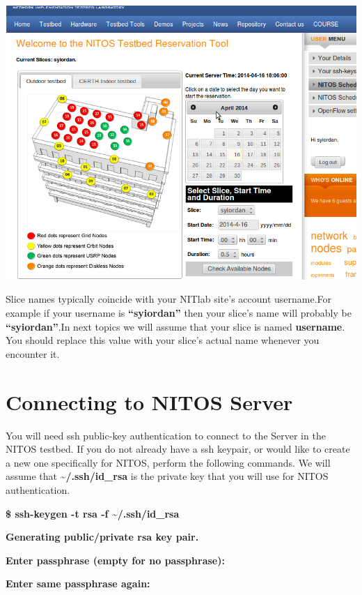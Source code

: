 \documentclass[letterpaper,10pt,english]{sphinxmanual}
\begin{document}
\includegraphics{ReservationPage.png}

Slice names typically coincide with your NITlab site's account username.For example if your username is \textbf{``syiordan''} then your slice's name will probably be \textbf{``syiordan''}.In next topics we will assume that your slice is named \textbf{username}. You should replace this value with your slice’s actual name whenever you encounter it.


\section{Connecting to NITOS Server}
\label{connectNITOS:connecting-to-nitos-server}\label{connectNITOS::doc}
You will need ssh public-key authentication to connect to the Server in the NITOS testbed. If you do not already have a ssh keypair, or would like to create a new one specifically for NITOS, perform the following commands. We will assume that \textbf{\textasciitilde{}/.ssh/id\_rsa} is the private key that you will use for NITOS authentication.

\begin{DUlineblock}{0em}
\item[] \textbf{\$ ssh-keygen -t rsa -f \textasciitilde{}/.ssh/id\_rsa}
\item[] \textbf{Generating public/private rsa key pair.}
\item[] \textbf{Enter passphrase (empty for no passphrase):}
\item[] \textbf{Enter same passphrase again:}
\end{DUlineblock}
\end{document}
